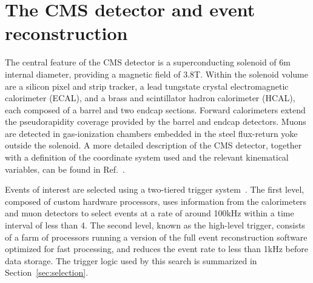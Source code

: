 \section{The CMS detector and event reconstruction}
\label{sec:reconstruction}

The central feature of the CMS detector is a superconducting solenoid
of 6\unit{m} internal diameter, providing a magnetic field of
3.8\unit{T}. Within the solenoid volume are a silicon pixel and strip
tracker, a lead tungstate crystal electromagnetic calorimeter (ECAL),
and a brass and scintillator hadron calorimeter (HCAL), each composed
of a barrel and two endcap sections. Forward calorimeters extend the
pseudorapidity coverage provided by the barrel and endcap
detectors. Muons are detected in gas-ionization chambers embedded in
the steel flux-return yoke outside the solenoid. A more detailed
description of the CMS detector, together with a definition of the
coordinate system used and the relevant kinematical variables, can be
found in Ref.~\cite{Chatrchyan:2008zzk}.

Events of interest are selected using a two-tiered trigger
system~\cite{Khachatryan:2016bia}. The first level, composed of custom
hardware processors, uses information from the calorimeters and muon
detectors to select events at a rate of around 100\unit{kHz} within a
time interval of less than 4\mus. The second level, known as the
high-level trigger, consists of a farm of processors running a version
of the full event reconstruction software optimized for fast
processing, and reduces the event rate to less than 1\unit{kHz} before
data storage. The trigger logic used by this search is summarized in
Section~\ref{sec:selection}.

